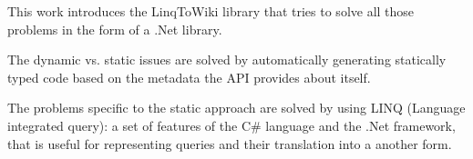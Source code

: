 \bigskip

This work introduces the LinqToWiki library that tries to solve all those problems
in the form of a .Net library.

The dynamic vs. static issues are solved by automatically generating statically typed
code based on the metadata the API provides about itself.

The problems specific to the static approach are solved by using LINQ (Language integrated query):
a set of features of the C\# language and the .Net framework,
that is useful for representing queries and their translation into a another form.